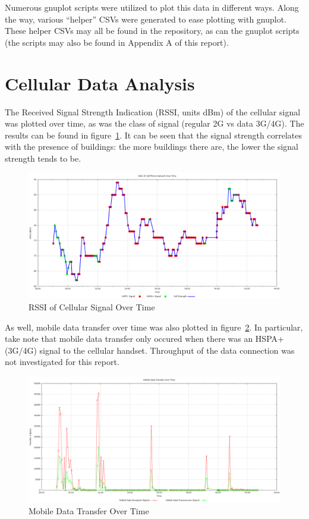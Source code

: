 \documentclass[journal,twocolumn]{IEEEtran}
\begin{document}
Numerous gnuplot scripts were utilized to plot this data in different ways. 
Along the way, various ``helper'' CSVs were generated to ease plotting with 
gnuplot. These helper CSVs may all be found in the repository, as can  the 
gnuplot scripts (the scripts may also be found in Appendix A of this report).

\section{Cellular Data Analysis}

The Received Signal Strength Indication (RSSI, units dBm) of the cellular 
signal was plotted over time, as was the class of signal (regular 2G vs data 
3G/4G). The results can be found in figure~\ref{fig_cell_1}. It can be seen 
that the signal strength correlates with the presence of buildings: the more 
buildings there are, the lower the signal strength tends to be.

\begin{figure}
\begin{center}
\includegraphics[scale=0.3]{cell-data/cell.png}
\caption{RSSI of Cellular Signal Over Time}
\label{fig_cell_1}
\end{center}
\end{figure}

As well, mobile data transfer over time was also plotted in
figure~\ref{fig_cell_2}. In particular, take note that mobile data transfer
only occured when there was an HSPA+ (3G/4G) signal to the cellular handset.
Throughput of the data connection was not investigated for this report.

\begin{figure}
\begin{center}
\includegraphics[scale=0.3]{cell-data/cell-2.png}
\caption{Mobile Data Transfer Over Time}
\label{fig_cell_2}
\end{center}
\end{figure}
\end{document}

